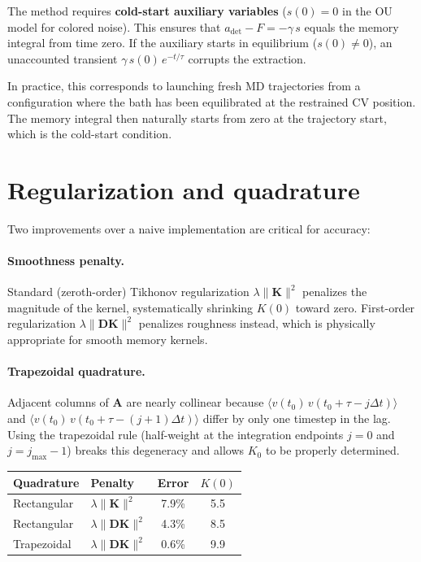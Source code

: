 \documentclass[11pt]{article}
\newcommand{\avg}[1]{\langle #1 \rangle}
\newcommand{\dt}{\Delta t}
\begin{document}
The method requires \textbf{cold-start auxiliary variables} ($s(0) = 0$
in the OU model for colored noise).
This ensures that $a_{\mathrm{det}} - F = -\gamma\,s$ equals the memory
integral from time zero.
If the auxiliary starts in equilibrium ($s(0) \neq 0$), an unaccounted
transient $\gamma\,s(0)\,e^{-t/\tau}$ corrupts the extraction.

In practice, this corresponds to launching fresh MD trajectories
from a configuration where the bath has been equilibrated at the
restrained CV position.
The memory integral then naturally starts from zero at the trajectory
start, which is the cold-start condition.

\section{Regularization and quadrature}

Two improvements over a naive implementation are critical for accuracy:

\paragraph{Smoothness penalty.}
Standard (zeroth-order) Tikhonov regularization $\lambda\|\bm{K}\|^2$
penalizes the magnitude of the kernel, systematically shrinking $K(0)$
toward zero.  First-order regularization $\lambda\|\bm{D}\bm{K}\|^2$
penalizes roughness instead, which is physically appropriate for smooth
memory kernels.

\paragraph{Trapezoidal quadrature.}
Adjacent columns of $\bm{A}$ are nearly collinear because
$\avg{v(t_0)\,v(t_0{+}\tau{-}j\dt)}$ and
$\avg{v(t_0)\,v(t_0{+}\tau{-}(j{+}1)\dt)}$ differ by only one timestep
in the lag.  Using the trapezoidal rule (half-weight at the integration
endpoints $j=0$ and $j=j_{\max}{-}1$) breaks this degeneracy and allows
$K_0$ to be properly determined.

\begin{center}
\begin{tabular}{l l c c}
\hline
Quadrature & Penalty & Error & $K(0)$ \\
\hline
Rectangular & $\lambda\|\bm{K}\|^2$       & 7.9\% & 5.5 \\
Rectangular & $\lambda\|\bm{D}\bm{K}\|^2$ & 4.3\% & 8.5 \\
Trapezoidal & $\lambda\|\bm{D}\bm{K}\|^2$ & 0.6\% & 9.9 \\
\hline
\end{tabular}
\end{center}
\end{document}
